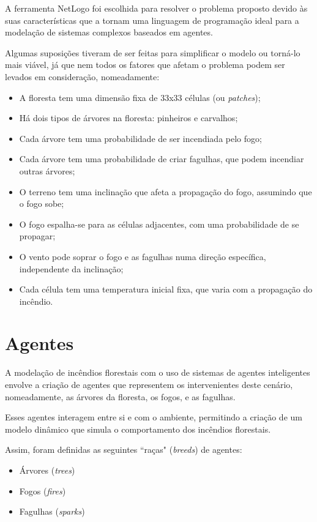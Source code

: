 A ferramenta NetLogo foi escolhida para resolver o problema proposto devido às suas características que a tornam uma linguagem de programação ideal para a modelação de sistemas complexos baseados em agentes. 

Algumas suposições tiveram de ser feitas para simplificar o modelo ou torná-lo mais viável, já que nem todos os fatores que afetam o problema podem ser levados em consideração, nomeadamente:
\begin{itemize}
    \item A floresta tem uma dimensão fixa de 33x33 células (ou \textit{patches});
    \item Há dois tipos de árvores na floresta: pinheiros e carvalhos;
    \item Cada árvore tem uma probabilidade de ser incendiada pelo fogo;
    \item Cada árvore tem uma probabilidade de criar fagulhas, que podem incendiar outras árvores;
    \item O terreno tem uma inclinação que afeta a propagação do fogo, assumindo que o fogo sobe;
    \item O fogo espalha-se para as células adjacentes, com uma probabilidade de se propagar;
    \item O vento pode soprar o fogo e as fagulhas numa direção específica, independente da inclinação;
    \item Cada célula tem uma temperatura inicial fixa, que varia com a propagação do incêndio.
\end{itemize}

\section{Agentes}\label{sec:agents}

A modelação de incêndios florestais com o uso de sistemas de agentes inteligentes envolve a criação de agentes que representem os intervenientes deste cenário, nomeadamente, as árvores da floresta, os fogos, e as fagulhas.

Esses agentes interagem entre si e com o ambiente, permitindo a criação de um modelo dinâmico que simula o comportamento dos incêndios florestais.

Assim, foram definidas as seguintes ``raças" (\textit{breeds}) de agentes:
\begin{itemize}
    \item Árvores (\textit{trees})
    \item Fogos (\textit{fires})
    \item Fagulhas (\textit{sparks})
\end{itemize}


